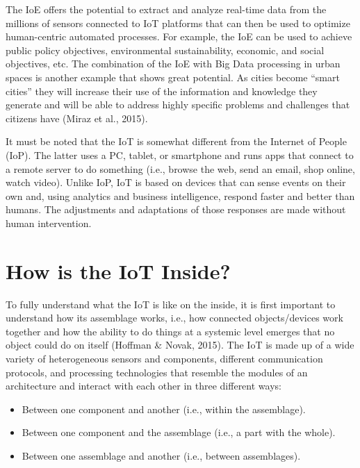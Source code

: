 \documentclass[
  letterpaper,
  DIV=11,
  numbers=noendperiod]{scrreprt}
\begin{document}
The IoE offers the potential to extract and analyze real-time data from
the millions of sensors connected to IoT platforms that can then be used
to optimize human-centric automated processes. For example, the IoE can
be used to achieve public policy objectives, environmental
sustainability, economic, and social objectives, etc. The combination of
the IoE with Big Data processing in urban spaces is another example that
shows great potential. As cities become ``smart cities'' they will
increase their use of the information and knowledge they generate and
will be able to address highly specific problems and challenges that
citizens have (Miraz et al., 2015).

It must be noted that the IoT is somewhat different from the Internet of
People (IoP). The latter uses a PC, tablet, or smartphone and runs apps
that connect to a remote server to do something (i.e., browse the web,
send an email, shop online, watch video). Unlike IoP, IoT is based on
devices that can sense events on their own and, using analytics and
business intelligence, respond faster and better than humans. The
adjustments and adaptations of those responses are made without human
intervention.

\hypertarget{how-is-the-iot-inside}{%
\section{How is the IoT Inside?}\label{how-is-the-iot-inside}}

To fully understand what the IoT is like on the inside, it is first
important to understand how its assemblage works, i.e., how connected
objects/devices work together and how the ability to do things at a
systemic level emerges that no object could do on itself (Hoffman \&
Novak, 2015). The IoT is made up of a wide variety of heterogeneous
sensors and components, different communication protocols, and
processing technologies that resemble the modules of an architecture and
interact with each other in three different ways:

\begin{itemize}
\item
  Between one component and another (i.e., within the assemblage).
\item
  Between one component and the assemblage (i.e., a part with the
  whole).
\item
  Between one assemblage and another (i.e., between assemblages).
\end{itemize}
\end{document}

